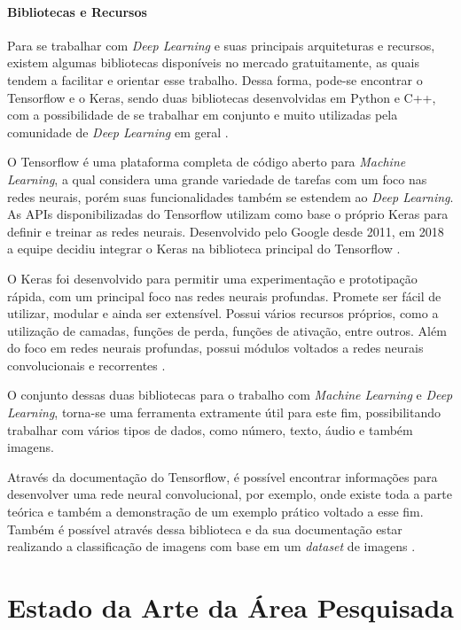 \subsubsection{Bibliotecas e Recursos}
Para se trabalhar com \emph{Deep Learning} e suas principais arquiteturas e recursos, existem algumas bibliotecas disponíveis no mercado gratuitamente, as quais tendem a facilitar e orientar esse trabalho. Dessa forma, pode-se encontrar o Tensorflow e o Keras, sendo duas bibliotecas desenvolvidas em Python e C++, com a possibilidade de se trabalhar em conjunto e muito utilizadas pela comunidade de \emph{Deep Learning} em geral \cite{deepLearningTensorFlow}.

O Tensorflow é uma plataforma completa de código aberto para \emph{Machine Learning}, a qual considera uma grande variedade de tarefas com um foco nas redes neurais, porém suas funcionalidades também se estendem ao \emph{Deep Learning}. As APIs disponibilizadas do Tensorflow utilizam como base o próprio Keras para definir e treinar as redes neurais. Desenvolvido pelo Google desde 2011, em 2018 a equipe decidiu integrar o Keras na biblioteca principal do Tensorflow \cite{websiteTensorFlow}.

O Keras foi desenvolvido para permitir uma experimentação e prototipação rápida, com um principal foco nas redes neurais profundas. Promete ser fácil de utilizar, modular e ainda ser extensível. Possui vários recursos próprios, como a utilização de camadas, funções de perda, funções de ativação, entre outros. Além do foco em redes neurais profundas, possui módulos voltados a redes neurais convolucionais e recorrentes \cite{websiteKeras}.

O conjunto dessas duas bibliotecas para o trabalho com \emph{Machine Learning} e \emph{Deep Learning}, torna-se uma ferramenta extramente útil para este fim, possibilitando trabalhar com vários tipos de dados, como número, texto, áudio e também imagens.

Através da documentação do Tensorflow, é possível encontrar informações para desenvolver uma rede neural convolucional, por exemplo, onde existe toda a parte teórica e também a demonstração de um exemplo prático voltado a esse fim. Também é possível através dessa biblioteca e da sua documentação estar realizando a classificação de imagens com base em um \emph{dataset} de imagens \cite{websiteTensorFlow}.

\chapter{Estado da Arte da Área Pesquisada}
\label{chap:mapeamento}

